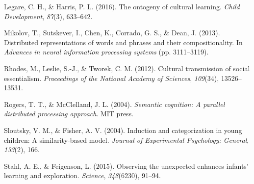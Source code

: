 \documentclass[10pt, letterpaper]{article}
\begin{document}
\leavevmode\hypertarget{ref-legare2016}{}%
Legare, C. H., \& Harris, P. L. (2016). The ontogeny of cultural
learning. \emph{Child Development}, \emph{87}(3), 633--642.

\leavevmode\hypertarget{ref-mikolov2013}{}%
Mikolov, T., Sutskever, I., Chen, K., Corrado, G. S., \& Dean, J.
(2013). Distributed representations of words and phrases and their
compositionality. In \emph{Advances in neural information processing
systems} (pp. 3111--3119).

\leavevmode\hypertarget{ref-rhodes2012}{}%
Rhodes, M., Leslie, S.-J., \& Tworek, C. M. (2012). Cultural
transmission of social essentialism. \emph{Proceedings of the National
Academy of Sciences}, \emph{109}(34), 13526--13531.

\leavevmode\hypertarget{ref-rogers2004}{}%
Rogers, T. T., \& McClelland, J. L. (2004). \emph{Semantic cognition: A
parallel distributed processing approach}. MIT press.

\leavevmode\hypertarget{ref-sloutsky2004}{}%
Sloutsky, V. M., \& Fisher, A. V. (2004). Induction and categorization
in young children: A similarity-based model. \emph{Journal of
Experimental Psychology: General}, \emph{133}(2), 166.

\leavevmode\hypertarget{ref-stahl2015}{}%
Stahl, A. E., \& Feigenson, L. (2015). Observing the unexpected enhances
infants' learning and exploration. \emph{Science}, \emph{348}(6230),
91--94.


\end{document}
